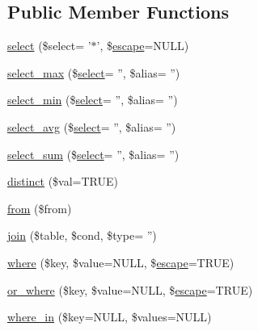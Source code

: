 \subsection*{Public Member Functions}
\begin{DoxyCompactItemize}
\item 
\hyperlink{class_c_i___d_b__active__record_ac6194faecb10a2731d6e6016f1714531}{select} (\$select= '$\ast$', \$\hyperlink{class_c_i___d_b__driver_ac8f37ca5703d4558c732e692194f8cd6}{escape}=N\-U\-L\-L)
\item 
\hyperlink{class_c_i___d_b__active__record_a3283a75881bf34d98cc13aa5a187c8ac}{select\-\_\-max} (\$\hyperlink{class_c_i___d_b__active__record_ac6194faecb10a2731d6e6016f1714531}{select}= '', \$alias= '')
\item 
\hyperlink{class_c_i___d_b__active__record_a460e37c355e9531b238b7c34d5979164}{select\-\_\-min} (\$\hyperlink{class_c_i___d_b__active__record_ac6194faecb10a2731d6e6016f1714531}{select}= '', \$alias= '')
\item 
\hyperlink{class_c_i___d_b__active__record_a7c1b8ed90462898bd0d4e95ac3ba1539}{select\-\_\-avg} (\$\hyperlink{class_c_i___d_b__active__record_ac6194faecb10a2731d6e6016f1714531}{select}= '', \$alias= '')
\item 
\hyperlink{class_c_i___d_b__active__record_aeb58275ab60ed426ce60ead616477e82}{select\-\_\-sum} (\$\hyperlink{class_c_i___d_b__active__record_ac6194faecb10a2731d6e6016f1714531}{select}= '', \$alias= '')
\item 
\hyperlink{class_c_i___d_b__active__record_a65b172f03eea17b7fa243f5732a592bd}{distinct} (\$val=T\-R\-U\-E)
\item 
\hyperlink{class_c_i___d_b__active__record_a91f5f004ed8e2237a4decc5d23ac3457}{from} (\$from)
\item 
\hyperlink{class_c_i___d_b__active__record_ad0bc485bb36a5ff045d6efe24dc10791}{join} (\$table, \$cond, \$type= '')
\item 
\hyperlink{class_c_i___d_b__active__record_a7519d8b5035bdb081e1e7d9cc7c716fb}{where} (\$key, \$value=N\-U\-L\-L, \$\hyperlink{class_c_i___d_b__driver_ac8f37ca5703d4558c732e692194f8cd6}{escape}=T\-R\-U\-E)
\item 
\hyperlink{class_c_i___d_b__active__record_a28b19c8d67694cbd9562878d5f38ae0d}{or\-\_\-where} (\$key, \$value=N\-U\-L\-L, \$\hyperlink{class_c_i___d_b__driver_ac8f37ca5703d4558c732e692194f8cd6}{escape}=T\-R\-U\-E)
\item 
\hyperlink{class_c_i___d_b__active__record_a2c8ee381f79063599c2a8e636f096c70}{where\-\_\-in} (\$key=N\-U\-L\-L, \$values=N\-U\-L\-L)

\end{DoxyCompactItemize}
